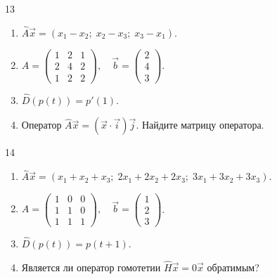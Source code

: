 \documentclass[12pt,a4paper]{article}
\theoremstyle{plain}
\theoremstyle{definition}
\begin{document}
\begin{taskbox}{13}
    \begin{enumerate}
        \item $\hat{A}\vec{x} = (x_1 - x_2; \; x_2 - x_3; \; x_3 - x_1)$.
        \item $A = \begin{pmatrix} 1 & 2 & 1 \\ 2 & 4 & 2 \\ 1 & 2 & 2 \end{pmatrix}, \quad \vec{b} = \begin{pmatrix} 2 \\ 4 \\ 3 \end{pmatrix}$.
        \item $\hat{D}(p(t)) = p'(1)$.
        \item Оператор $\hat{A}\vec{x} = (\vec{x} \cdot \vec{i})\vec{j}$. Найдите матрицу оператора.
    \end{enumerate}
\end{taskbox}

\begin{taskbox}{14}
    \begin{enumerate}
        \item $\hat{A}\vec{x} = (x_1 + x_2 + x_3; \; 2x_1 + 2x_2 + 2x_3; \; 3x_1 + 3x_2 + 3x_3)$.
        \item $A = \begin{pmatrix} 1 & 0 & 0 \\ 1 & 1 & 0 \\ 1 & 1 & 1 \end{pmatrix}, \quad \vec{b} = \begin{pmatrix} 1 \\ 2 \\ 3 \end{pmatrix}$.
        \item $\hat{D}(p(t)) = p(t+1)$.
        \item Является ли оператор гомотетии $\hat{H}\vec{x} = 0\vec{x}$ обратимым?
    \end{enumerate}
\end{taskbox}
\end{document}

